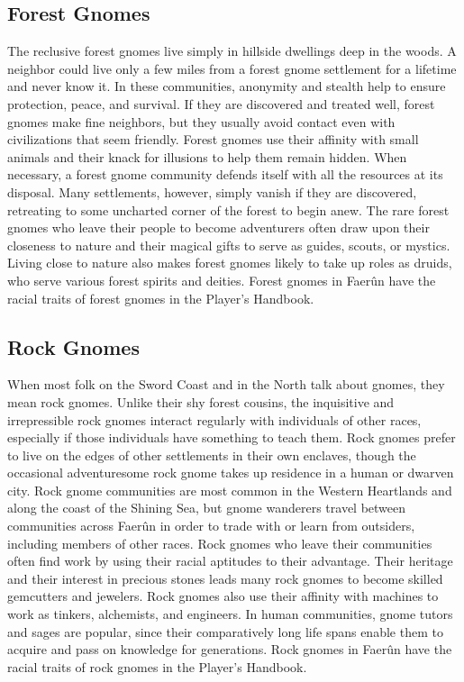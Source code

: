 \documentclass[10pt,a4paper,twoside,twocolumn,openany,bg=print,nodeprecatedcode]{dndbook}
\begin{document}
\subsection{Forest Gnomes}
The reclusive forest gnomes live simply in hillside dwellings deep in the woods. A neighbor could live only a few miles from a forest gnome settlement for a lifetime and never know it. In these communities, anonymity and stealth help to ensure protection, peace, and survival. If they are discovered and treated well, forest gnomes make fine neighbors, but they usually avoid contact even with civilizations that seem friendly.
Forest gnomes use their affinity with small animals and their knack for illusions to help them remain hidden. When necessary, a forest gnome community defends itself with all the resources at its disposal. Many settlements, however, simply vanish if they are discovered, retreating to some uncharted corner of the forest to begin anew.
The rare forest gnomes who leave their people to become adventurers often draw upon their closeness to nature and their magical gifts to serve as guides, scouts, or mystics. Living close to nature also makes forest gnomes likely to take up roles as druids, who serve various forest spirits and deities.
Forest gnomes in Faerûn have the racial traits of forest gnomes in the Player's Handbook.
\subsection{Rock Gnomes}
When most folk on the Sword Coast and in the North talk about gnomes, they mean rock gnomes. Unlike their shy forest cousins, the inquisitive and irrepressible rock gnomes interact regularly with individuals of other races, especially if those individuals have something to teach them. Rock gnomes prefer to live on the edges of other settlements in their own enclaves, though the occasional adventuresome rock gnome takes up residence in a human or dwarven city.
Rock gnome communities are most common in the Western Heartlands and along the coast of the Shining Sea, but gnome wanderers travel between communities across Faerûn in order to trade with or learn from outsiders, including members of other races.
Rock gnomes who leave their communities often find work by using their racial aptitudes to their advantage. Their heritage and their interest in precious stones leads many rock gnomes to become skilled gemcutters and jewelers. Rock gnomes also use their affinity with machines to work as tinkers, alchemists, and engineers. In human communities, gnome tutors and sages are popular, since their comparatively long life spans enable them to acquire and pass on knowledge for generations.
Rock gnomes in Faerûn have the racial traits of rock gnomes in the Player's Handbook.
\end{document}
